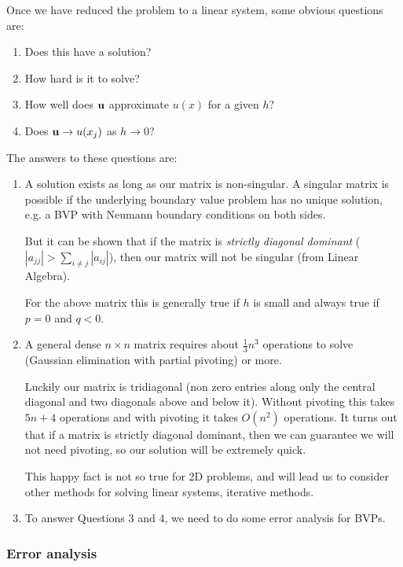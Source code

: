 \documentclass[12pt, a4paper]{article}
\theoremstyle{definition}
\theoremstyle{remark}
\numberwithin{equation}{section}
\begin{document}


Once we have reduced the problem to a linear system, some obvious questions are:
\begin{enumerate}
\item Does this have a solution?
\item How hard is it to solve?
\item How well does $\bf{u}$ approximate $u(x)$ for a given $h$?
\item Does ${\bf u} \to u(x_j)$ as $h \to 0$?
\end{enumerate}

\newpage
The answers to these questions are:
\begin{enumerate}
\item [1.] A solution exists as long as our matrix is non-singular.  A singular matrix is possible if the underlying boundary value problem has no unique solution,
e.g.  a BVP with Neumann boundary conditions on both sides.

But it can be shown that if the matrix is \emph{strictly diagonal dominant} ($|a_{jj}|>\sum_{i\neq j}|a_{ij}|$), then our matrix will not be  singular (from Linear Algebra). 

For the above matrix this is generally true if $h$ is small and always true if $p=0$ and $q<0$.

\item [2.] A general dense $n \times n$ matrix requires about $\frac{1}{3}n^{3}$ operations to solve (Gaussian elimination with partial pivoting) or more. 

Luckily our matrix is tridiagonal (non zero entries along only the central diagonal and two diagonals above and below it). Without pivoting this takes $5n + 4$ operations and with pivoting it takes $O(n^2)$ operations. It turns out that if a matrix is strictly diagonal dominant, then we can guarantee we will not need pivoting, so our solution will be extremely quick. 

This happy fact is not so true for 2D problems, and will lead us to consider other methods for solving linear systems, iterative methods. 
\item [3/4.] To answer Questions 3 and 4, we need to do some error analysis for BVPs.

\end{enumerate}

\newpage

\subsubsection{Error analysis}
\end{document}
